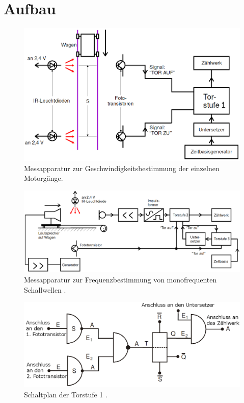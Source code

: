 \section{Aufbau}
\label{sec:Aufbau}
\begin{figure}
	\centering
	\includegraphics[width=\linewidth-50pt,height=\textheight-50pt,keepaspectratio]{content/Bilder/Geschwindigkeitsmessung.png}
	\caption{Messapparatur zur Geschwindigkeitsbestimmung der einzelnen Motorgänge\cite{V104}.}
	\label{fig:Aufbau}
\end{figure}
\begin{figure}
	\centering
	\includegraphics[width=\linewidth-50pt,height=\textheight-50pt,keepaspectratio]{content/Bilder/Frequenzmessung.png}
	\caption{Messapparatur zur Frequenzbestimmung von monofrequenten Schallwellen \cite{V104}.}
	\label{fig:Aufbau2}
\end{figure}
\begin{figure}
	\centering
	\includegraphics[width=\linewidth-50pt,height=\textheight-50pt,keepaspectratio]{content/Bilder/Torstufe1.png}
	\caption{Schaltplan der Torstufe 1 \cite{V104}.}
	\label{fig:Aufbasteve}
\end{figure}
